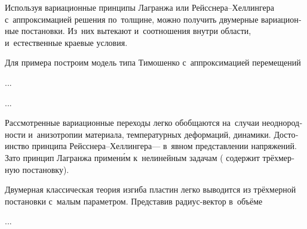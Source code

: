 \begin{otherlanguage}{russian}

Используя вариационные принципы Лагранжа или Рейсснера--Хеллингера с~аппроксимацией решения по~толщине, можно получить двумерные вариационные постановки. Из~них вытекают и~соотношения внутри области, и~естественные краевые условия.

Для примера построим модель типа Тимошенко с~аппроксимацией перемещений

...


...

Рассмотренные вариационные переходы легко обобщаются на~случаи неоднородности и~анизотропии материала, температурных деформаций, динамики. Достоинство принципа Рейсснера--Хеллингера\:--- в~явном представлении напряжений. \hbox{Зато} принцип Лагранжа примен\'{и}м к~нелинейным задачам ( содержит трёхмерную постановку).

\end{otherlanguage}



\begin{otherlanguage}{russian}

Двумерная классическая теория изгиба пластин легко выводится из трёхмерной постановки с~малым параметром. Представив радиус\hbox{-}вектор в~объёме

...



\end{otherlanguage}




